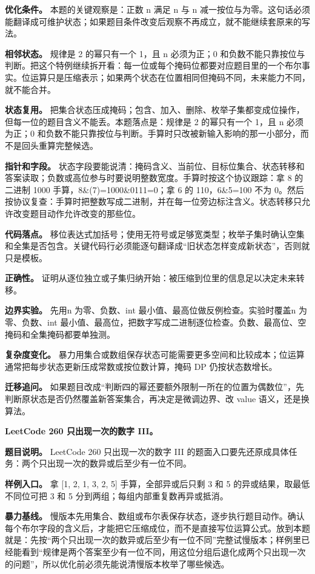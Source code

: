 \textbf{优化条件。} 本题的关键观察是：正数 n 满足 n 与 n 减一按位与为零。这句话必须能翻译成可维护状态；如果题目条件改变后观察不再成立，就不能继续套原来的写法。

\textbf{相邻状态。} 规律是 2 的幂只有一个 1，且 n 必须为正；0 和负数不能只靠按位与判断。把这个特例继续拆开看：每一位或每个掩码位都要对应题目里的一个布尔事实。位运算只是压缩表示；如果两个状态在位置相同但掩码不同，未来能力不同，就不能合并。

\textbf{状态复用。} 把集合状态压成掩码；包含、加入、删除、枚举子集都变成位操作，但每一位的题目含义不能丢。本题落点是：规律是 2 的幂只有一个 1，且 n 必须为正；0 和负数不能只靠按位与判断。手算时只改被新输入影响的那一小部分，而不是回头重算完整候选。

\textbf{指针和字段。} 状态字段要能说清：掩码含义、当前位、目标位集合、状态转移和答案读取；负数或高位参与时要说明整数宽度。手算时按这个协议跟踪：拿 8 的二进制 1000 手算，8\&(7)=1000\&0111=0；拿 6 的 110，6\&5=100 不为 0。然后按协议复查：手算时把整数写成二进制，并在每一位旁边标注含义。状态转移只允许改变题目动作允许改变的那些位。

\textbf{代码落点。} 移位表达式加括号；使用无符号或足够宽类型；枚举子集时确认空集和全集是否包含。关键代码行必须能逐句翻译成“旧状态怎样变成新状态”，否则就只是模板。

\textbf{正确性。} 证明从逐位独立或子集归纳开始：被压缩到位里的信息足以决定未来转移。

\textbf{边界实验。} 先用n 为零、负数、int 最小值、最高位做反例检查。实验时覆盖n 为零、负数、int 最小值、最高位，把数字写成二进制逐位检查。负数、最高位、空掩码和全集掩码都要单独测。

\textbf{复杂度变化。} 暴力用集合或数组保存状态可能需要更多空间和比较成本；位运算通常把每步状态更新压成常数或按位数计算，掩码 DP 仍按状态数增长。

\textbf{迁移追问。} 如果题目改成“判断四的幂还要额外限制一所在的位置为偶数位”，先判断原状态是否仍然覆盖新答案集合，再决定是微调边界、改 value 语义，还是换算法。

\noindent\textbf{LeetCode 260 只出现一次的数字 III。}

\textbf{题目说明。} LeetCode 260 只出现一次的数字 III 的题面入口要先还原成具体任务：两个只出现一次的数异或后至少有一位不同。

\textbf{样例入口。} 拿 [1, 2, 1, 3, 2, 5] 手算，全部异或后只剩 3 和 5 的异或结果，取最低不同位可把 3 和 5 分到两组；每组内部重复数再异或抵消。

\textbf{暴力基线。} 慢版本先用集合、数组或布尔表保存状态，逐步执行题目动作。确认每个布尔字段的含义后，才能把它压缩成位，而不是直接写位运算公式。放到本题就是：先按“两个只出现一次的数异或后至少有一位不同”完整试慢版本；样例里已经能看到“规律是两个答案至少有一位不同，用这位分组后退化成两个只出现一次的问题”，所以优化前必须先能说清慢版本枚举了哪些候选。

